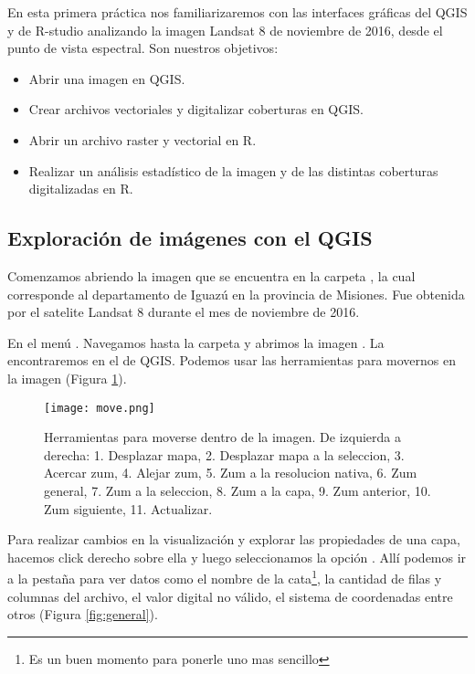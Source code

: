 En esta primera práctica nos familiarizaremos con las interfaces gráficas del
QGIS y de R-studio analizando la imagen Landsat 8 de noviembre de
2016, desde el punto de vista espectral. Son nuestros objetivos:

\begin{itemize}
    \item Abrir una imagen en QGIS.
    \item Crear archivos vectoriales y digitalizar coberturas en QGIS.
    \item Abrir un archivo raster y vectorial en R.
    \item Realizar un análisis estad\'istico de la imagen y de las
        distintas coberturas digitalizadas en R.
\end{itemize}
\subsection{Exploración de im\'agenes con el QGIS}

Comenzamos abriendo la imagen  que se encuentra
en la carpeta , la cual  corresponde al
departamento de Iguaz\'u en la provincia de Misiones. Fue obtenida por
el satelite Landsat 8 durante el mes de noviembre de 2016.

En el menú . Navegamos
hasta la carpeta  y abrimos la imagen
. La encontraremos
en el  de QGIS. Podemos usar las herramientas para
movernos en la imagen (Figura \ref{fig:move}).

\begin{figure}[h!]
\begin{center}
    \texttt{[image: move.png]}
\end{center}
\caption{Herramientas para moverse dentro de la imagen. De izquierda a derecha:
    1. Desplazar mapa, 2. Desplazar mapa a la seleccion, 3. Acercar zum, 4.
    Alejar zum, 5. Zum a la resolucion nativa, 6. Zum general, 7. Zum a la
    seleccion, 8. Zum a la capa, 9. Zum anterior, 10. Zum siguiente, 11.
    Actualizar.}
\label{fig:move}
\end{figure}

Para realizar cambios en la visualizaci\'on y explorar las propiedades de una
capa, hacemos click derecho sobre ella y luego seleccionamos la opci\'on
. All\'i podemos ir a la pestaña
 para ver datos como el nombre de la cata\footnote{Es un buen
momento para ponerle uno mas sencillo}, la cantidad de filas y columnas del
archivo, el valor digital no v\'alido, el sistema de coordenadas
entre otros (Figura \ref{fig:general}).

